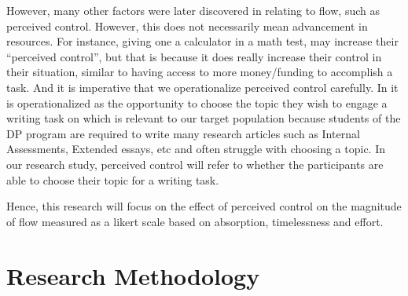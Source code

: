 \documentclass{article}
\begin{document}
However, many other factors were later discovered in relating to flow, such as perceived control. However, this does not necessarily mean advancement in resources. For instance, giving one a calculator in a math test, may increase their ``perceived control'', but that is because it does really increase their control in their situation, similar to having access to more money/funding to accomplish a task. And it is imperative that we operationalize perceived control carefully. 
In \parencite{AINLEY2008109} it is operationalized as the opportunity to choose the topic they wish to engage a writing task on which is relevant to our target population because students of the DP program are required to write many research articles such as Internal Assessments, Extended essays, etc and often struggle with choosing a topic. In our research study, perceived control will refer to whether the participants are able to choose their topic for a writing task.

Hence, this research will focus on the effect of perceived control on the magnitude of flow measured as a likert scale based on absorption, timelessness and effort. %

\section{Research Methodology}

    
\end{document}
